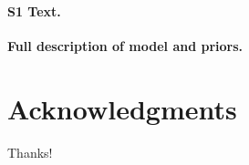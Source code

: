 \documentclass[10pt,letterpaper]{article}
\begin{document}
\paragraph*{S1 Text.}
\label{S1_Diag}
{\bf Full description of model and priors.}

\section*{Acknowledgments}

Thanks!

\nolinenumbers

%
%
% 



\end{document}

